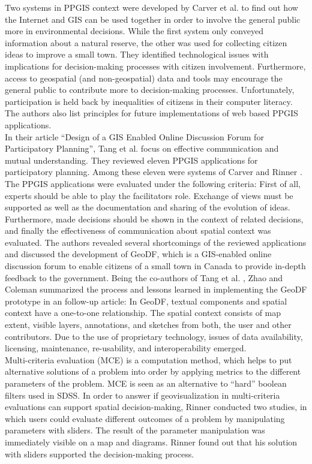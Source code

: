 Two systems in PPGIS context were developed by Carver et al. \cite{Carver2001_PPGIS_Cyberdemocracy} to find out how the Internet and GIS can be used together in order to involve the general public more in environmental decisions. While the first system only conveyed information about a natural reserve, the other was used for collecting citizen ideas to improve a small town. They identified technological issues with implications for decision-making processes with citizen involvement. Furthermore, access to geospatial (and non-geospatial) data and tools may encourage the general public to contribute more to decision-making processes. Unfortunately, participation is held back by inequalities of citizens in their computer literacy. The authors also list principles for future implementations of web based PPGIS applications.\\
In their article ``Design of a GIS Enabled Online Discussion Forum for Participatory Planning'', Tang et al. \cite{Tang2005_PPGIS_discussion_forum} focus on effective communication and mutual understanding. They reviewed eleven PPGIS applications for participatory planning. Among these eleven were systems of Carver \cite{Carver2001_PPGIS_Cyberdemocracy} and Rinner \cite{Rinner_ArgumentationMaps,Kessler2005_ArgumentationMapPrototype}. The PPGIS applications were evaluated under the following criteria: First of all, experts should be able to play the facilitators role. Exchange of views must be supported as well as the documentation and sharing of the evolution of ideas. Furthermore, made decisions should be shown in the context of related decisions, and finally the effectiveness of communication about spatial context was evaluated. The authors revealed several shortcomings of the reviewed applications and discussed the development of GeoDF, which is a GIS-enabled online discussion forum to enable citizens of a small town in Canada to provide in-depth feedback to the government. Being the co-authors of Tang et al. \cite{Tang2005_PPGIS_discussion_forum}, Zhao and Coleman \cite{zhao2006geodf} summarized the process and lessons learned in implementing the GeoDF prototype in an follow-up article: In GeoDF, textual components and spatial context have a one-to-one relationship. The spatial context consists of map extent, visible layers, annotations, and sketches from both, the user and other contributors. Due to the use of proprietary technology, issues of data availability, licensing, maintenance, re-usability, and interoperability emerged.\\
Multi-criteria evaluation (MCE) is a computation method, which helps to put alternative solutions of a problem into order by applying metrics to the different parameters of the problem. MCE is seen as an alternative to ``hard'' boolean filters used in SDSS. In order to answer if geovisualization in multi-criteria evaluations can support spatial decision-making, Rinner \cite{Rinner2007_geovis_decisionsupport} conducted two studies, in which users could evaluate different outcomes of a problem by manipulating parameters with sliders. The result of the parameter manipulation was immediately visible on a map and diagrams. Rinner found out that his solution with sliders supported the decision-making process.\\
